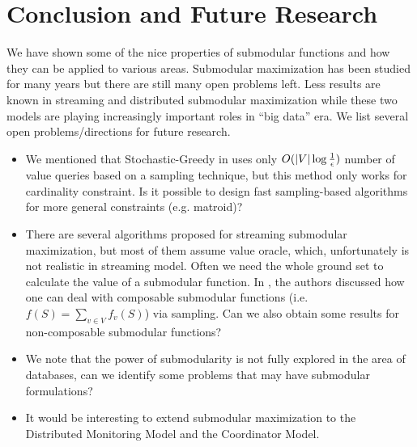 \section{Conclusion and Future Research}
\label{sec:conclusion}
We have shown some of the nice properties of submodular functions and how they can be applied to various areas. Submodular maximization has been studied for many years but there are still many open problems left. Less results are known in streaming and distributed submodular maximization while these two models are playing increasingly important roles in ``big data'' era. We list several open problems/directions for future research.

\begin{itemize}
\item We mentioned that {\sc Stochastic-Greedy} in \cite{MBK+15} uses only $O(|V|\log\frac{1}{\epsilon})$ number of value queries based on a sampling technique, but this method only works for cardinality constraint. Is it possible to design fast sampling-based algorithms for more general constraints (e.g. matroid)?
\item There are several algorithms proposed for streaming submodular maximization, but most of them assume value oracle, which, unfortunately is not realistic in streaming model. Often we need the whole ground set to calculate the value of a submodular function. In \cite{BMK+14}, the authors discussed how one can deal with composable submodular functions (i.e. $f(S) = \sum_{v\in V}f_v(S)$) via sampling. Can we also obtain some results for non-composable submodular functions?
\item We note that the power of submodularity is not fully explored in the area of databases, can we identify some problems that may have submodular formulations? 
\item It would be interesting to extend submodular maximization to the Distributed Monitoring Model \cite{CMY11} and the Coordinator Model.
\end{itemize}
